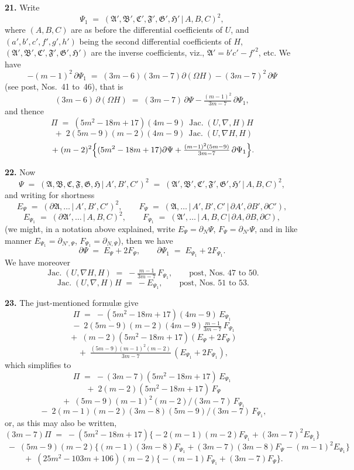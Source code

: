 \documentclass[11pt,a4paper]{article}
\providecommand{\mid}{\,|\,}
\providecommand{\Jac}{\operatorname{Jac.}}
\begin{document}
\medskip

\textbf{21.} Write
\[
\Psi_1 \;=\; (\mathfrak{A}',\mathfrak{B}',\mathfrak{C}',\mathfrak{F}',\mathfrak{G}',\mathfrak{H}'\mid A,B,C)^2,
\]
where $(A,B,C)$ are as before the differential coefficients of $U$, and $(a',b',c',f',g',h')$ being the second differential coefficients of $H$, $(\mathfrak{A}',\mathfrak{B}',\mathfrak{C}',\mathfrak{F}',\mathfrak{G}',\mathfrak{H}')$ are the inverse coefficients, viz., $\mathfrak{A}' = b'c' - f'^2$, etc. We have
\[
-(m-1)^2\,\partial\Psi_1 \;=\; (3m-6)(3m-7)\partial(\Omega H) - (3m-7)^2\,\partial\Psi
\]
(see post, Nos.~41 to~46), that is
\[
(3m-6)\,\partial(\Omega H) \;=\; (3m-7)\,\partial\Psi - \tfrac{(m-1)^2}{3m-7}\,\partial\Psi_1,
\]
and thence
\[
\Pi \;=\; (5m^2-18m+17)(4m-9)\,\Jac(U,\nabla,H)H
\]
\[
\;+\; 2(5m-9)(m-2)(4m-9)\,\Jac(U,\nabla H,H)
\]
\[
\;+\; (m-2)^2\Bigl\{(5m^2-18m+17)\partial\Psi + \tfrac{(m-1)^2(5m-9)}{3m-7}\,\partial\Psi_1\Bigr\}.
\]

\medskip

\textbf{22.} Now
\[
\Psi \;=\; (\mathfrak{A},\mathfrak{B},\mathfrak{C},\mathfrak{F},\mathfrak{G},\mathfrak{H}\mid A',B',C')^2 \;=\; (\mathfrak{A}',\mathfrak{B}',\mathfrak{C}',\mathfrak{F}',\mathfrak{G}',\mathfrak{H}'\mid A,B,C)^2,
\]
and writing for shortness
\[
E_\Psi \;=\; (\partial\mathfrak{A},\ldots\mid A',B',C')^2, \qquad F_\Psi \;=\; (\mathfrak{A},\ldots\mid A',B',C'\mid \partial A',\partial B',\partial C'),
\]
\[
E_{\Psi_1} \;=\; (\partial\mathfrak{A}',\ldots\mid A,B,C)^2, \qquad F_{\Psi_1} \;=\; (\mathfrak{A}',\ldots\mid A,B,C\mid \partial A,\partial B,\partial C),
\]
(we might, in a notation above explained, write $E_\Psi = \partial_{N}\Psi$, $F_\Psi = \partial_{N'}\Psi$, and in like manner $E_{\Psi_1} = \partial_{N',\Psi}$, $F_{\Psi_1} = \partial_{N,\Psi}$), then we have
\[
\partial\Psi \;=\; E_\Psi + 2F_\Psi, \qquad \partial\Psi_1 \;=\; E_{\Psi_1} + 2F_{\Psi_1}.
\]
We have moreover
\[
\Jac(U,\nabla H,H) \;=\; -\tfrac{m-1}{3m-7}\,F_{\Psi_1}, \qquad \text{post, Nos.~47 to~50.}
\]
\[
\Jac(U,\nabla,H)H \;=\; -E_{\Psi_1}, \qquad \text{post, Nos.~51 to~53.}
\]

\medskip

\textbf{23.} The just-mentioned formul{\ae} give
\[
\Pi \;=\; -(5m^2-18m+17)(4m-9)\,E_{\Psi_1}
\]
\[
\;-\; 2(5m-9)(m-2)(4m-9)\tfrac{m-1}{3m-7}\,F_{\Psi_1}
\]
\[
\;+\; (m-2)(5m^2-18m+17)(E_\Psi + 2F_\Psi)
\]
\[
\;+\; \tfrac{(5m-9)(m-1)^2(m-2)}{3m-7}\,(E_{\Psi_1} + 2F_{\Psi_1}),
\]
which simplifies to
\[
\Pi \;=\; -(3m-7)(5m^2-18m+17)\,E_{\Psi_1}
\]
\[
\;+\; 2(m-2)(5m^2-18m+17)\,F_\Psi
\]
\[
\;+\; (5m-9)(m-1)^2(m-2)/(3m-7)\,F_{\Psi_1}
\]
\[
\;-\; 2(m-1)(m-2)(3m-8)(5m-9)/(3m-7)\,F_{\Psi_1},
\]
or, as this may also be written,
\[
(3m-7)\Pi \;=\; -(5m^2-18m+17)\bigl\{-2(m-1)(m-2)F_{\Psi_1} + (3m-7)^2 E_{\Psi_1}\bigr\}
\]
\[
\;-\; (5m-9)(m-2)\bigl\{(m-1)(3m-8)F_{\Psi_1} + (3m-7)(3m-8)F_\Psi - (m-1)^2 E_{\Psi_1}\bigr\}
\]
\[
\;+\; (25m^2-103m+106)(m-2)\bigl\{-(m-1)F_{\Psi_1} + (3m-7)F_\Psi\bigr\}.
\]
\end{document}
